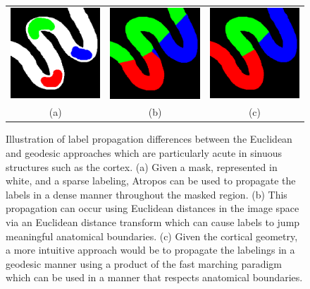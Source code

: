 \documentclass[11pt,english]{article}
\begin{document}
\begin{figure}
\begin{center}
\begin{tabular}{ccc}
\includegraphics[width=50mm]{sparse_labels.png} &
\includegraphics[width=50mm]{prop_euclidean.png} &
\includegraphics[width=50mm]{prop_geodesic.png} \\
(a) & (b) & (c) \\
\end{tabular}
\caption{\baselineskip 12pt \small  Illustration of label propagation differences between the Euclidean and geodesic approaches which
are particularly acute in sinuous structures such as the cortex.  (a) Given a mask, represented in white, and a sparse labeling,
Atropos can be used to propagate the labels in a dense manner throughout the masked region.  (b) This propagation can occur using Euclidean distances in the image space via an Euclidean distance transform which can cause labels to jump meaningful anatomical boundaries.   (c) Given the cortical geometry, a more intuitive approach would be to propagate the labelings in a geodesic manner using a product of the fast marching paradigm which can be used in a manner that respects anatomical boundaries.  }
\label{fig:label_propagation}
\end{center}
\end{figure}
\end{document}
